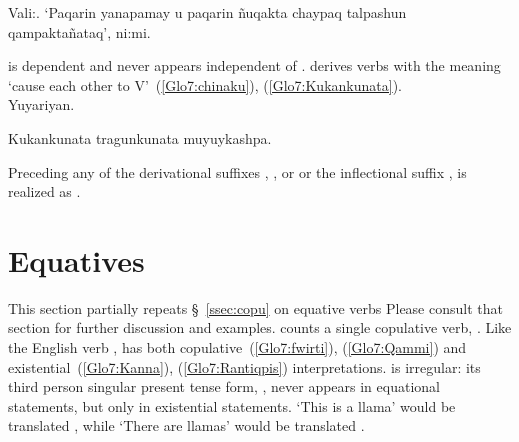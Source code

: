 %
{Vali:. ‘Paqarin yanapamay u paqarin ñuqakta chaypaq talpashun qampaktañataq’, ni:mi.}%
{}%
{}{}%

\noindent
{} is dependent and never appears independent of .  derives verbs with the meaning ‘cause each other to V’~(\ref{Glo7:chinaku}), (\ref{Glo7:Kukankunata}).\\

%
{Yuyariyan.}%
{}%
{}{}%

%
{Kukankunata tragunkunata muyuykashpa.}%
{}%
{}{}%

Preceding any of the derivational suffixes , , or  or the inflectional suffix ,  is realized as .

\section{Equatives}\label{sec:equative}
This section partially repeats §~\ref{ssec:copu} on equative verbs Please consult that section for further discussion and examples. \SYQ{} counts a single copulative verb, . Like the English verb ,  has both copulative~(\ref{Glo7:fwirti}), (\ref{Glo7:Qammi}) and existential~(\ref{Glo7:Kanna}), (\ref{Glo7:Rantiqpis}) interpretations.  is irregular: its third person singular present tense form, , never appears in equational statements, but only in existential statements. ‘This is a llama’ would be translated  , while ‘There are llamas’ would be translated .\\

